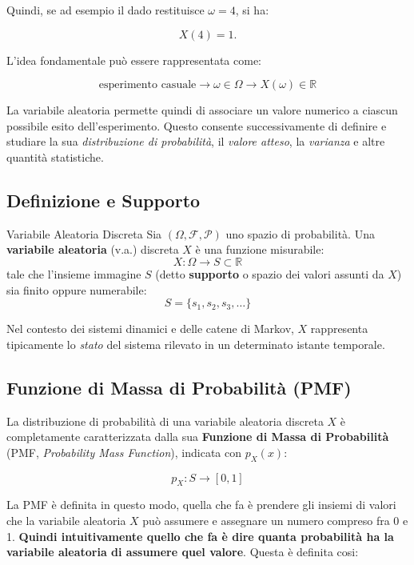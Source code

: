 Quindi, se ad esempio il dado restituisce $\omega=4$, si ha:

$$
X(4)=1.
$$

L'idea fondamentale può essere rappresentata come:

$$
\boxed{
\text{esperimento casuale}
\longrightarrow
\omega\in\Omega
\longrightarrow
X(\omega)\in\mathbb{R}
}
$$

La variabile aleatoria permette quindi di associare un valore numerico a ciascun possibile esito dell'esperimento. Questo consente successivamente di definire e studiare la sua \emph{distribuzione di probabilità}, il \emph{valore atteso}, la \emph{varianza} e altre quantità statistiche.



\subsection{Definizione e Supporto}

\begin{definition}{Variabile Aleatoria Discreta}
Sia $(\Omega, \mathcal{F}, \mathcal{P})$ uno spazio di probabilità. Una \textbf{variabile aleatoria} (v.a.) discreta $X$ è una funzione misurabile:
\[
X: \Omega \longrightarrow S \subset \mathbb{R}
\]
tale che l'insieme immagine $S$ (detto \textbf{supporto} o spazio dei valori assunti da $X$) sia finito oppure numerabile:
\[
S = \{s_1, s_2, s_3, \dots\}
\]
\end{definition}

Nel contesto dei sistemi dinamici e delle catene di Markov, $X$ rappresenta tipicamente lo \emph{stato} del sistema rilevato in un determinato istante temporale.

\subsection{Funzione di Massa di Probabilità (PMF)}

La distribuzione di probabilità di una variabile aleatoria discreta $X$ è completamente caratterizzata dalla sua \textbf{Funzione di Massa di Probabilità} (PMF, \emph{Probability Mass Function}), indicata con $p_X(x)$:

\[
p_X : S \to [0,1]
\]

La PMF è definita in questo modo, quella che fa è prendere gli insiemi di valori che la variabile aleatoria $X$ può assumere e assegnare un numero compreso fra 0 e 1.
\textbf{Quindi intuitivamente quello che fa è dire quanta probabilità ha la variabile aleatoria di assumere quel valore}.
Questa è definita cosi:

